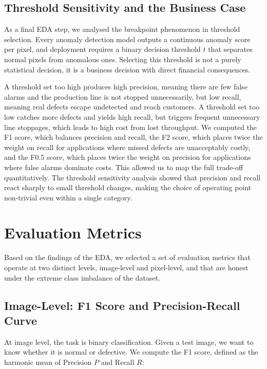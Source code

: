 \documentclass[11pt, a4paper]{article}
\begin{document}
\subsection{Threshold Sensitivity and the Business Case}
\label{sec:threshold_eda}

As a final EDA step, we analysed the breakpoint phenomenon in threshold selection. Every anomaly detection model outputs a continuous anomaly score per pixel, and deployment requires a binary decision threshold $t$ that separates normal pixels from anomalous ones. Selecting this threshold is not a purely statistical decision, it is a business decision with direct financial consequences.

A threshold set too high produces high precision, meaning there are few false alarms and the production line is not stopped unnecessarily, but low recall, meaning real defects escape undetected and reach customers. A threshold set too low catches more defects and yields high recall, but triggers frequent unnecessary line stoppages, which leads to high cost from lost throughput. We computed the F1 score, which balances precision and recall, the F2 score, which places twice the weight on recall for applications where missed defects are unacceptably costly, and the F0.5 score, which places twice the weight on precision for applications where false alarms dominate costs. This allowed us to map the full trade-off quantitatively. The threshold sensitivity analysis showed that precision and recall react sharply to small threshold changes, making the choice of operating point non-trivial even within a single category.

\section{Evaluation Metrics}
\label{sec:metrics}

Based on the findings of the EDA, we selected a set of evaluation metrics that operate at two distinct levels, image-level and pixel-level, and that are honest under the extreme class imbalance of the dataset.

\subsection{Image-Level: F1 Score and Precision-Recall Curve}

At image level, the task is binary classification. Given a test image, we want to know whether it is normal or defective. We compute the F1 score, defined as the harmonic mean of Precision $P$ and Recall $R$:
\end{document}
